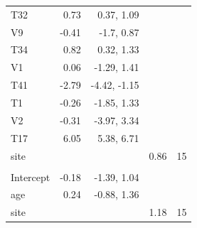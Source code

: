 \documentclass[
]{article}
\begin{document}
\begin{longtable}[t]{lrrrr}
\hspace{1em}T32 & 0.73 & 0.37, 1.09 &  & \\
\hspace{1em}V9 & -0.41 & -1.7, 0.87 &  & \\
\hspace{1em}T34 & 0.82 & 0.32, 1.33 &  & \\
\hspace{1em}V1 & 0.06 & -1.29, 1.41 &  & \\
\hspace{1em}T41 & -2.79 & -4.42, -1.15 &  & \\
\hspace{1em}T1 & -0.26 & -1.85, 1.33 &  & \\
\hspace{1em}V2 & -0.31 & -3.97, 3.34 &  & \\
\hspace{1em}T17 & 6.05 & 5.38, 6.71 &  & \\
\hspace{1em}site &  &  & 0.86 & 15\\
\addlinespace[0.3em]
\multicolumn{5}{l}{\textbf{Zero-inflation model}}\\
\hspace{1em}Intercept & -0.18 & -1.39, 1.04 &  & \\
\hspace{1em}age & 0.24 & -0.88, 1.36 &  & \\
\hspace{1em}site &  &  & 1.18 & 15\\
\bottomrule
\end{longtable}
\end{document}
